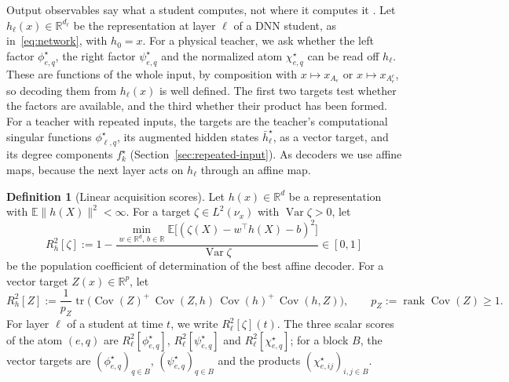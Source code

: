 \documentclass[11pt]{article}
\newcommand{\rank}{\operatorname{rank}}
\newcommand{\R}{\mathbb{R}}
\newcommand{\E}{\mathbb{E}}
\newcommand{\norm}[1]{\lVert #1\rVert}
\newcommand{\hb}{\bar{h}}
\newcommand{\Cov}{\operatorname{Cov}}
\newcommand{\Var}{\operatorname{Var}}
\theoremstyle{definition}
\newtheorem{definition}[theorem]{Definition}
\numberwithin{equation}{section}
\begin{document}
Output observables say what a student computes, not where it computes it \citep[Section~8.5]{hfl_local}. Let $h_\ell(x)\in\R^{d_\ell}$ be the representation at layer $\ell$ of a DNN student, as in~\eqref{eq:network}, with $h_0=x$. For a physical teacher, we ask whether the left factor $\phi^\star_{e,q}$, the right factor $\psi^\star_{e,q}$ and the normalized atom $\chi^\star_{e,q}$ can be read off $h_\ell$. These are functions of the whole input, by composition with $x\mapsto x_{A_e}$ or $x\mapsto x_{A_e^c}$, so decoding them from $h_\ell(x)$ is well defined. The first two targets test whether the factors are available, and the third whether their product has been formed. For a teacher with repeated inputs, the targets are the teacher's computational singular functions $\phi^\star_{\ell,q}$, its augmented hidden states $\hb^\star_\ell$, as a vector target, and its degree components $f^\star_k$ (Section~\ref{sec:repeated-input}). As decoders we use affine maps, because the next layer acts on $h_\ell$ through an affine map.

\begin{definition}[Linear acquisition scores]\label{def:probe}
Let $h(x)\in\R^d$ be a representation with $\E\norm{h(X)}^2<\infty$. For a target $\zeta\in L^2(\nu_x)$ with $\Var\zeta>0$, let
\[
R^2_h[\zeta]:=1-\frac{\min_{w\in\R^d,\,b\in\R}\E\big[(\zeta(X)-w^\top h(X)-b)^2\big]}{\Var\zeta}\in[0,1]
\]
be the population coefficient of determination of the best affine decoder. For a vector target $Z(x)\in\R^p$, let
\[
R^2_h[Z]:=\frac1{p_Z}\operatorname{tr}\Big(\Cov(Z)^+\,\Cov(Z,h)\,\Cov(h)^+\,\Cov(h,Z)\Big),\qquad p_Z:=\rank\Cov(Z)\ge1.
\]
For layer $\ell$ of a student at time $t$, we write $R^2_\ell[\zeta](t)$. The three scalar scores of the atom $(e,q)$ are $R^2_\ell[\phi^\star_{e,q}]$, $R^2_\ell[\psi^\star_{e,q}]$ and $R^2_\ell[\chi^\star_{e,q}]$; for a block $B$, the vector targets are $(\phi^\star_{e,q})_{q\in B}$, $(\psi^\star_{e,q})_{q\in B}$ and the products $(\chi^\star_{e,ij})_{i,j\in B}$.
\end{definition}
\end{document}

